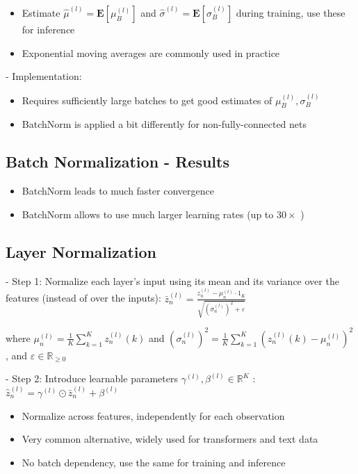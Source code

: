 \begin{itemize}
  \item Estimate $\hat{\mu}^{(l)}=\mathbf{E}\left[\mu_{B}^{(l)}\right]$ and $\hat{\sigma}^{(l)}=\mathbf{E}\left[\sigma_{B}^{(l)}\right]$ during training, use these for inference
  \item Exponential moving averages are commonly used in practice
\end{itemize}

- Implementation:

\begin{itemize}
  \item Requires sufficiently large batches to get good estimates of $\mu_{B}^{(l)}, \sigma_{B}^{(l)}$
  \item BatchNorm is applied a bit differently for non-fully-connected nets
\end{itemize}

\subsection*{Batch Normalization - Results}

\begin{itemize}
  \item BatchNorm leads to much faster convergence
  \item BatchNorm allows to use much larger learning rates (up to $30 \times$ )
\end{itemize}

\subsection*{Layer Normalization}
- Step 1: Normalize each layer's input using its mean and its variance over the features (instead of over the inputs):
$
\bar{z}_{n}^{(l)}=\frac{z_{n}^{(l)}-\mu_{n}^{(l)} \cdot 1_{K}}{\sqrt{\left(\sigma_{n}^{(l)}\right)^{2}+\varepsilon}}
$

where $\mu_{n}^{(l)}=\frac{1}{K} \sum_{k=1}^{K} z_{n}^{(l)}(k)$ and $\left(\sigma_{n}^{(l)}\right)^{2}=\frac{1}{K} \sum_{k=1}^{K}\left(z_{n}^{(l)}(k)-\mu_{n}^{(l)}\right)^{2}$, and $\varepsilon \in \mathbb{R}_{\geq 0}$

- Step 2: Introduce learnable parameters $\gamma^{(l)}, \beta^{(l)} \in \mathbb{R}^{K}$ :
$
\hat{z}_{n}^{(l)}=\gamma^{(l)} \odot \bar{z}_{n}^{(l)}+\beta^{(l)}
$

\begin{itemize}
  \item Normalize across features, independently for each observation
  \item Very common alternative, widely used for transformers and text data
  \item No batch dependency, use the same for training and inference
\end{itemize}

